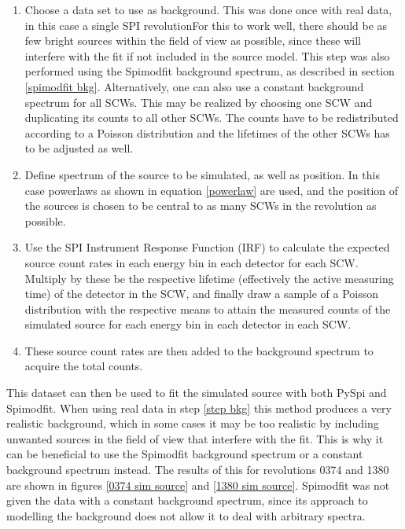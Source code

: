 \documentclass{article}
\begin{document}
\begin{enumerate}
    \item \label{step bkg}Choose a data set to use as background. This was done once with real data, in this case a single SPI revolutionFor this to work well, there should be as few bright sources within the field of view as possible, since these will interfere with the fit if not included in the source model. This step was also performed using the Spimodfit background spectrum, as described in section \ref{spimodfit bkg}. Alternatively, one can also use a constant background spectrum for all SCWs. This may be realized by choosing one SCW and duplicating its counts to all other SCWs. The counts have to be  redistributed according to a Poisson distribution and the lifetimes of the other SCWs has to be adjusted as well. 
    
    \item Define spectrum of the source to be simulated, as well as position. In this case powerlaws as shown in equation \ref{powerlaw} are used, and the position of the sources is chosen to be central to as many SCWs in the revolution as possible.
    
    \item Use the SPI Instrument Response Function (IRF) to calculate the expected source count rates in each energy bin in each detector for each SCW. Multiply by these be the respective lifetime (effectively the active measuring time) of the detector in the SCW, and finally draw a sample of a Poisson distribution with the respective means to attain the measured counts of the simulated source for each energy bin in each detector in each SCW.
    
    \item These source count rates are then added to the background spectrum to acquire the total counts.
\end{enumerate}

This dataset can then be used to fit the simulated source with both PySpi and Spimodfit. When using real data in step \ref{step bkg} this method produces a very realistic background, which in some cases it may be too realistic by including unwanted sources in the field of view that interfere with the fit. This is why it can be beneficial to use the Spimodfit background spectrum or a constant background spectrum instead. The results of this for revolutions 0374 and 1380 are shown in figures \ref{0374 sim source} and \ref{1380 sim source}. Spimodfit was not given the data with a constant background spectrum, since its approach to modelling the background does not allow it to deal with arbitrary spectra. 
\end{document}
